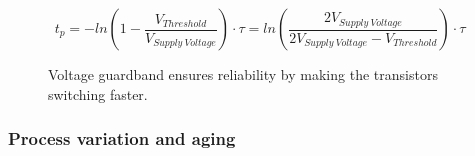 \begin{equation}
    t_p=-ln \left( 1-\frac{V_{Threshold}}{V_{Supply \: Voltage}}\right)\cdot\tau=ln\left(\frac{2V_{Supply \: Voltage}}{2V_{Supply \: Voltage}-V_{Threshold}}\right)\cdot\tau
    \label{eq:tp_v_scaling}
\end{equation}

\begin{figure}[!htb]
    \centering
  \begin{subfigmatrix}{2}
  \end{subfigmatrix}
  \caption{Voltage guardband ensures reliability by making the transistors switching faster.}
\end{figure}




\subsubsection{Process variation and aging}


